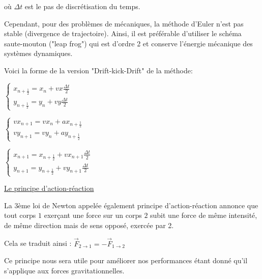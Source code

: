 \vspace{2mm}

où $\Delta t$ est le pas de discrétisation du temps.

\vspace{2mm}

Cependant, pour des problèmes de mécaniques, la méthode d'Euler n'est pas stable (divergence de trajectoire). Ainsi, il est préférable d'utiliser le schéma saute-mouton ("leap frog") qui est d'ordre 2 et conserve l'énergie mécanique des systèmes dynamiques.

\vspace{2mm}
Voici la forme de la version "Drift-kick-Drift" de la méthode:

$
\left\{
    \begin{array}{ll}
        x_{n+\frac{1}{2}} = x_n + vx \frac{\Delta t}{2} \\
        y_{n+\frac{1}{2}} = y_n + vy \frac{\Delta t}{2}
    \end{array}
\right.
$

\vspace{2mm}

$
\left\{
    \begin{array}{ll}
        vx_{n+1} = vx_n + ax_{n+\frac{1}{2}} \\
        vy_{n+1} = vy_n + ay_{n+\frac{1}{2}}
    \end{array}
\right.
$

\vspace{2mm}

$
\left\{
    \begin{array}{ll}
        x_{n+1} = x_{n+\frac{1}{2}} + vx_{n+1}\frac{\Delta t}{2}\\
        y_{n+1} = y_{n+\frac{1}{2}} + vy_{n+1}\frac{\Delta t}{2}
    \end{array}
\right.
$


\vspace{5mm}
\underline{Le principe d'action-réaction}
\vspace{2mm}

La 3ème loi de Newton appelée également principe d'action-réaction annonce que tout corps $1$ exerçant une force sur un corps $2$ subit une force de même intensité, de même direction mais de sens opposé, exercée par 2.

\vspace{2mm}

Cela se traduit ainsi :
$\vec{F}_{2 \rightarrow 1} = -\vec{F}_{1 \rightarrow 2}  $

\vspace{2mm}
Ce principe nous sera utile pour améliorer nos performances étant donné qu'il s'applique aux forces gravitationnelles.


